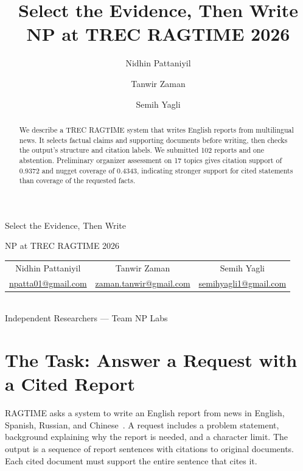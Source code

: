 \documentclass[11pt,letterpaper]{article}
\title{Select the Evidence, Then Write\\\large NP at TREC RAGTIME 2026}
\author{Nidhin Pattaniyil \and Tanwir Zaman \and Semih Yagli}
\date{}
\begin{document}
\begin{center}
{\LARGE Select the Evidence, Then Write\par}
\smallskip
{\large NP at TREC RAGTIME 2026\par}
\smallskip
\begin{tabular}{@{}ccc@{}}
Nidhin Pattaniyil & Tanwir Zaman & Semih Yagli\\[2pt]
{\small\href{mailto:npatta01@gmail.com}{\textcolor{sea}{npatta01@gmail.com}}} &
{\small\href{mailto:zaman.tanwir@gmail.com}{\textcolor{sea}{zaman.tanwir@gmail.com}}} &
{\small\href{mailto:semihyagli1@gmail.com}{\textcolor{sea}{semihyagli1@gmail.com}}}
\end{tabular}\\[3pt]
Independent Researchers --- Team NP Labs
\end{center}
\begin{abstract}
We describe a TREC RAGTIME system that writes English reports from multilingual news. It selects factual claims and supporting documents before writing, then checks the output's structure and citation labels. We submitted 102 reports and one abstention. Preliminary organizer assessment on 17 topics gives citation support of 0.9372 and nugget coverage of 0.4343, indicating stronger support for cited statements than coverage of the requested facts.
\end{abstract}

\section{The Task: Answer a Request with a Cited Report}
RAGTIME asks a system to write an English report from news in English, Spanish, Russian, and Chinese~\cite{guidelines}. A request includes a problem statement, background explaining why the report is needed, and a character limit. The output is a sequence of report sentences with citations to original documents. Each cited document must support the entire sentence that cites it.
\end{document}
